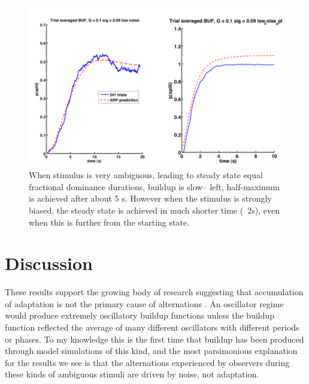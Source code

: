 \documentclass[10pt]{article}
\begin{document}
\begin{figure}[scale=0.5]
   \begin{center}
   
   \includegraphics[scale=0.33]{../ambiguous_vs_biased}
   
   \caption{When stimulus is very ambiguous, leading to steady state equal fractional dominance durations, buildup is slow-- left, half-maximum is achieved after about 5 s. However when the stimulus is strongly biased, the steady state is achieved in much shorter time (~2s), even when this is further from the starting state.}
   	\label{fig:ambiguous_vs_biased}
   \end{center}
\end{figure}
%
\section*{Discussion}

These results support the growing body of research suggesting that accumulation of adaptation is not the primary cause of alternations \cite{Pastukhov2013}. An oscillator regime would produce extremely oscillatory buildup functions unless the buildup function reflected the average of many different oscillators with different periods or phases. To my knowledge this is the first time that buildup has been produced through model simulations of this kind, and the most parsimonious explanation for the results we see is that the alternations experienced by observers during these kinds of ambiguous stimuli are driven by noise, not adaptation.

\end{document}
